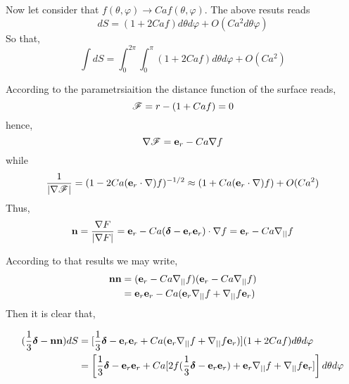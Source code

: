 Now let consider  that $f(\theta , \varphi)\to Ca f(\theta , \varphi)$.
The above resuts reads 
\begin{equation}
    dS 
    =
    (1+2Ca f) 
    d\theta d\varphi
    + O(Ca^2d\theta\varphi)
\end{equation}
So that, 
\begin{equation}
    \int dS 
    =
    \int_0^{2\pi}
    \int_0^{\pi}
    (1+2Ca f) 
    d\theta d\varphi
    + O(Ca^2)
\end{equation}


According to the parametrsiaition the distance function of the surface reads,
\begin{equation}
    \mathscr{F} = r - (1+Ca f) = 0
\end{equation}
hence, 
\begin{equation}
    \mathbf{\nabla} \mathscr{F} = \textbf{e}_r - Ca \mathbf{\nabla} f
\end{equation}
while
\begin{equation}
    \frac{1}{|\mathbf{\nabla} \mathscr{F}|} = (1 - 2 Ca  (\textbf{e}_r \cdot \mathbf{\nabla}) f)^{-1/2}
    \approx (1+ Ca (\textbf{e}_r \cdot \mathbf{\nabla}) f) +O(Ca^2)
\end{equation}
Thus,
\begin{equation}
    \textbf{n} 
    =
    \frac{\mathbf{\nabla} F}{|\mathbf{\nabla} F|}
    =
    \textbf{e}_r - Ca (\bm\delta - \textbf{e}_r \textbf{e}_r) \cdot \mathbf{\nabla} f
    =
    \textbf{e}_r - Ca \mathbf{\nabla}_{||} f
\end{equation}

According to that results we may write, 
\begin{align*}
    \textbf{nn} 
    &=
    (\textbf{e}_r - Ca \mathbf{\nabla}_{||} f)
    (\textbf{e}_r - Ca \mathbf{\nabla}_{||} f)\\
    &=
    \textbf{e}_r \textbf{e}_r
    - Ca (\textbf{e}_r \mathbf{\nabla}_{||} f + \mathbf{\nabla}_{||} f \textbf{e}_r )
\end{align*}
Then it is clear that, 

\begin{align}
    (\frac{1}{3}\bm\delta - \textbf{nn}) dS
    &=
    [
    \frac{1}{3}\bm\delta
    - \textbf{e}_r \textbf{e}_r
    + Ca (\textbf{e}_r \mathbf{\nabla}_{||} f + \mathbf{\nabla}_{||} f \textbf{e}_r )
    ]
    (1 + 2 Ca f) d\theta d\varphi
    \\
    &=
    \left[
    \frac{1}{3}\bm\delta   
    - \textbf{e}_r \textbf{e}_r 
    + Ca [
        2f(\frac{1}{3}\bm\delta 
        - \textbf{e}_r \textbf{e}_r )
        + \textbf{e}_r \mathbf{\nabla}_{||} f 
        + \mathbf{\nabla}_{||} f \textbf{e}_r 
        ]
    \right]d\theta d\varphi
    \\
\end{align}


